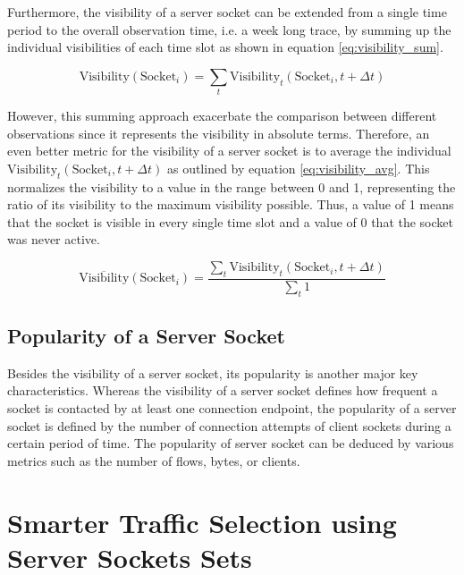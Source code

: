 Furthermore, the visibility of a \gls{server socket} can be extended from a single time period to the overall observation time, i.e. a week long trace, by summing up the individual visibilities of each time slot as shown in equation \ref{eq:visibility_sum}.

\begin{equation}
	\text{Visibility}(\text{Socket}_i) = \sum_{t} \text{Visibility}_t(\text{Socket}_i,t+\Delta{t})
	\label{eq:visibility_sum}
\end{equation}

However, this summing approach exacerbate the comparison between different observations since it represents the visibility in absolute terms. 
Therefore, an even better metric for the visibility of a \gls{server socket} is to average the individual $\text{Visibility}_t(\text{Socket}_i,t+\Delta{t})$ as outlined by equation \ref{eq:visibility_avg}.
This normalizes the visibility to a value in the range between 0 and 1, representing the ratio of its visibility to the maximum visibility possible. 
Thus, a value of 1 means that the socket is visible in every single time slot and a value of 0 that the socket was never active.

\begin{equation}
	\overline{\text{Visibility}}(\text{Socket}_i) = \frac{\sum_{t} \text{Visibility}_t(\text{Socket}_i,t+\Delta{t})}{\sum_{t}1}
	\label{eq:visibility_avg}
\end{equation}

\subsection{Popularity of a Server Socket}

Besides the visibility of a \gls{server socket}, its popularity is another major key characteristics. 
Whereas the visibility of a \gls{server socket} defines how frequent a socket is contacted by at least one connection endpoint, the popularity of a \gls{server socket} is defined by the number of connection attempts of client sockets during a certain period of time. 
The popularity of \gls{server socket} can be deduced by various metrics such as the number of flows, bytes, or clients.

\section{Smarter Traffic Selection using Server Sockets Sets 
\label{section:ses_traffic_selection}}

